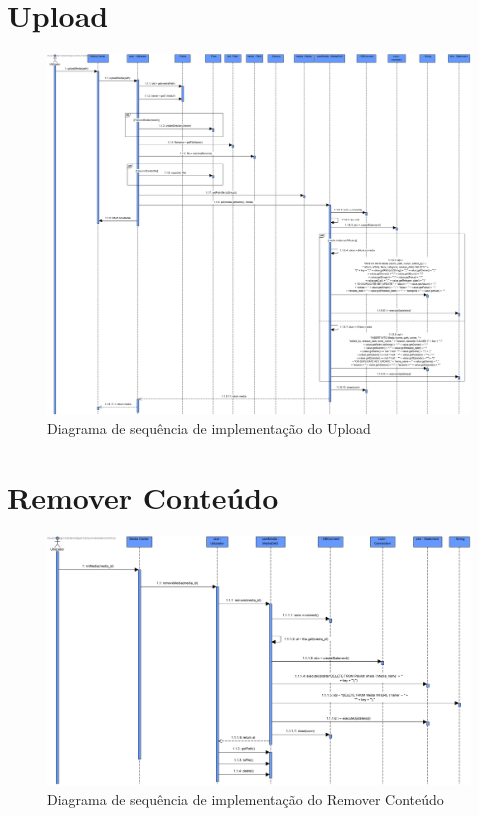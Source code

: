 \documentclass[a4paper]{report}
\begin{document}
\section{Upload}
\begin{figure}[H]
	\centering 
    \includegraphics[width=\textwidth]{images/uploadImp.png}  
    \caption{Diagrama de sequência de implementação do Upload}
\end{figure}

\section{Remover Conteúdo}
\begin{figure}[H]
	\centering 
    \includegraphics[width=\textwidth]{images/remContImp.png}  
    \caption{Diagrama de sequência de implementação do Remover Conteúdo}
\end{figure}
\end{document}

